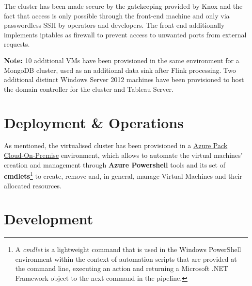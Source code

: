 The cluster has been made secure by the gatekeeping provided by Knox and the fact that access is only possible through the front-end machine and only via passwordless SSH by operators and developers. The front-end additionally implements iptables as firewall to prevent access to unwanted ports from external requests.

\textbf{Note:} 10 additional VMs have been provisioned in the same environment for a MongoDB cluster, used as an additional data sink after Flink processing. Two additional distinct Windows Server 2012 machines have been provisioned to host the domain controller for the cluster and Tableau Server.

\section{Deployment \& Operations}

As mentioned, the virtualised cluster has been provisioned in a \href{https://www.microsoft.com/it-it/cloud-platform/windows-azure-pack}{Azure Pack Cloud-On-Premise} environment, which allows to automate the virtual machines' creation and management through \textbf{Azure Powershell} tools and its set of \textbf{cmdlets}\footnote{A \textit{cmdlet} is a lightweight command that is used in the Windows PowerShell environment within the context of automation scripts that are provided at the command line, executing an action and returning a Microsoft .NET Framework object to the next command in the pipeline.} to create, remove and, in general, manage Virtual Machines and their allocated resources.







\section{Development}









